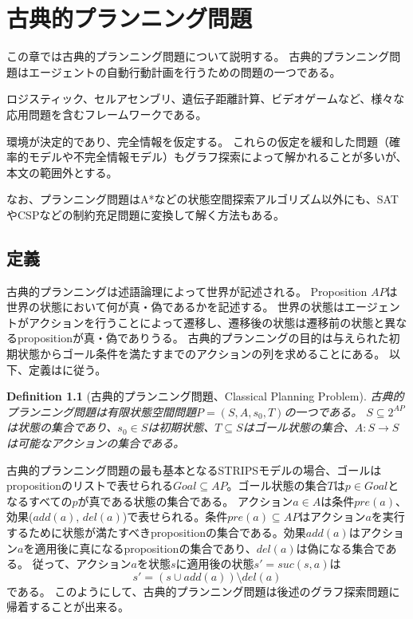 \documentclass{report}
\newtheorem{definition}{Definition}
\begin{document}
\chapter{古典的プランニング問題}
\label{ch:classical-planning}
この章では古典的プランニング問題について説明する。
古典的プランニング問題はエージェントの自動行動計画を行うための問題の一つである\cite{}。

ロジスティック\cite{helmert2010scanalyzer,sousa2013toward}、セルアセンブリ\cite{asai2014fully}、遺伝子距離計算\cite{erdem2005genome}、ビデオゲーム\cite{Lipovetzky2015a}など、様々な応用問題を含むフレームワークである。

環境が決定的であり、完全情報を仮定する。
これらの仮定を緩和した問題（確率的モデルや不完全情報モデル）もグラフ探索によって解かれることが多いが、本文の範囲外とする\cite{}。

なお、プランニング問題はA*などの状態空間探索アルゴリズム以外にも、SATやCSPなどの制約充足問題に変換して解く方法もある\cite{}。

\section{定義}


古典的プランニングは述語論理によって世界が記述される\cite{fikes:71}。
Proposition $AP$は世界の状態において何が真・偽であるかを記述する。
世界の状態はエージェントがアクションを行うことによって遷移し、遷移後の状態は遷移前の状態と異なるpropositionが真・偽でありうる。
古典的プランニングの目的は与えられた初期状態からゴール条件を満たすまでのアクションの列を求めることにある。
以下、定義は\cite{edelkamp:2010:hst:1875144}に従う。

\begin{definition}[古典的プランニング問題、Classical Planning Problem]
古典的プランニング問題は有限状態空間問題$P = (S,A,s_0,T)$の一つである。
$S \subseteq 2^{AP}$は状態の集合であり、$s_0 \in S$は初期状態、$T \subseteq S$はゴール状態の集合、$A: S \rightarrow S$は可能なアクションの集合である。
\end{definition}

古典的プランニング問題の最も基本となるSTRIPSモデル\cite{fikes:71}の場合、ゴールはpropositionのリストで表せられる$Goal \subseteq AP$。ゴール状態の集合$T$は$p \in Goal$となるすべての$p$が真である状態の集合である。
アクション$a \in A$は条件$pre(a)$、効果($add(a)$, $del(a)$)で表せられる。条件$pre(a) \subseteq AP$はアクション$a$を実行するために状態が満たすべきpropositionの集合である。効果$add(a)$はアクション$a$を適用後に真になるpropositionの集合であり、$del(a)$は偽になる集合である。
従って、アクション$a$を状態$s$に適用後の状態$s' = suc(s,a)$は
\begin{equation}
	s' = (s \cup add(a)) \setminus del(a)
\end{equation}
である。
このようにして、古典的プランニング問題は後述のグラフ探索問題に帰着することが出来る。
\end{document}
